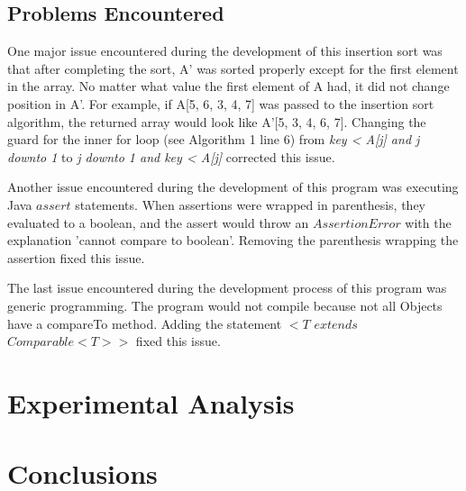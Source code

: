 \documentclass[onecolumn, 12pt, article]{IEEEtran}
\numberwithin{case}{problem}
\numberwithin{condition}{problem}
\numberwithin{condition}{subsection}
\numberwithin{definition}{section}
\theoremstyle{remark}
\numberwithin{question}{problem}
\theoremstyle{plain}
\numberwithin{answer}{problem}
\numberwithin{solution}{section}
\numberwithin{equation}{section}%
\begin{document}
\subsection{Problems Encountered}
One major issue encountered during the development of this insertion sort was that after completing the sort, A' was sorted properly except for the first element in the array. No matter what value the first element of A had, it did not change position in A'. For example, if A[5, 6, 3, 4, 7] was passed to the insertion sort algorithm, the returned array would look like A'[5, 3, 4, 6, 7]. Changing the guard for the inner for loop (see Algorithm 1 line 6) from \textit{key < A[j] and j downto 1} to \textit{j downto 1 and key < A[j]} corrected this issue.

Another issue encountered during the development of this program was executing Java $assert$ statements. When assertions were wrapped in parenthesis, they evaluated to a boolean, and the assert would throw an $AssertionError$ with the explanation 'cannot compare to boolean'. Removing the parenthesis wrapping the assertion fixed this issue.

The last issue encountered during the development process of this program was generic programming. The program would not compile because not all Objects have a compareTo method. Adding the statement $<T$ $extends$ $Comparable<T>>$ fixed this issue. \cite{erik}

\section{Experimental Analysis}


\section{Conclusions}


\newpage


\nocite{*}




\newpage
\end{document}
